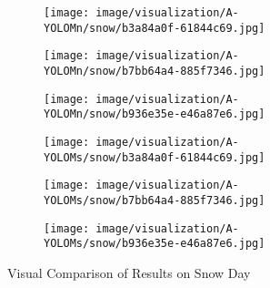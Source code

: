 \documentclass[lettersize,journal]{IEEEtran}
\begin{document}
{\begin{figure*}[!h]
    \begin{subfigure}[b]{0.05\textwidth}
        \centering
        \vspace{0.2cm}
    \end{subfigure}\begin{subfigure}{0.25\textwidth}
        \centering
        \texttt{[image: image/visualization/A-YOLOMn/snow/b3a84a0f-61844c69.jpg]}
    \end{subfigure}\hspace{0.5cm}
    \begin{subfigure}{0.25\textwidth}
        \centering
        \texttt{[image: image/visualization/A-YOLOMn/snow/b7bb64a4-885f7346.jpg]}
    \end{subfigure}\hspace{0.5cm}
    \begin{subfigure}{0.25\textwidth}
        \centering
        \texttt{[image: image/visualization/A-YOLOMn/snow/b936e35e-e46a87e6.jpg]}
    \end{subfigure}

    \medskip
    
    \begin{subfigure}[b]{0.05\textwidth}
        \centering
        \vspace{0.1cm}
    \end{subfigure}\begin{subfigure}{0.25\textwidth}
        \centering
        \texttt{[image: image/visualization/A-YOLOMs/snow/b3a84a0f-61844c69.jpg]}
    \end{subfigure}\hspace{0.5cm}
    \begin{subfigure}{0.25\textwidth}
        \centering
        \texttt{[image: image/visualization/A-YOLOMs/snow/b7bb64a4-885f7346.jpg]}
    \end{subfigure}\hspace{0.5cm}
    \begin{subfigure}{0.25\textwidth}
        \centering
        \texttt{[image: image/visualization/A-YOLOMs/snow/b936e35e-e46a87e6.jpg]}
    \end{subfigure}
    \caption{Visual Comparison of Results on Snow Day}
    \label{fig:snow_day_comparison}
\end{figure*}

}
\end{document}
